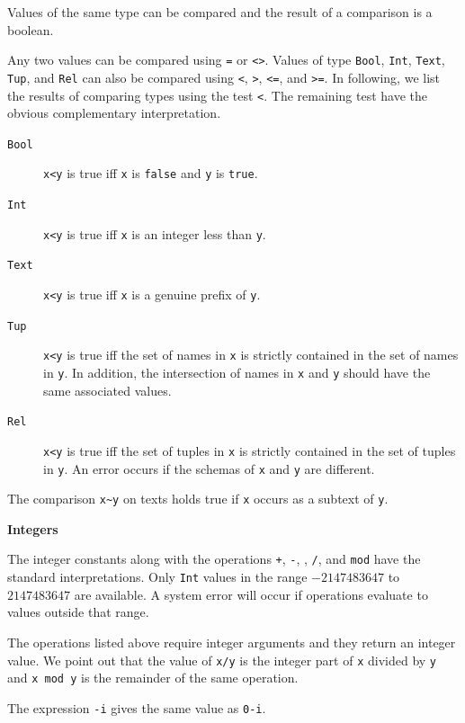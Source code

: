 \documentclass[a4,14pt,latin1]{article}
\begin{document}
Values of the same type can be compared and the result of a comparison is
a boolean.

Any two values can be compared using {\tt =} or {\tt <>}.
Values of type {\tt Bool}, {\tt Int}, {\tt Text}, {\tt Tup}, and
{\tt Rel} can also be compared using {\tt <}, {\tt >}, {\tt <=}, and {\tt >=}.
In following, we list the results of comparing types using the test {\tt <}.
The remaining test have the obvious complementary interpretation.
\begin{description}%
\item[{\tt Bool}]
{\tt x<y} is true iff {\tt x} is {\tt false} and {\tt y} is {\tt true}.
\item[{\tt Int}]
{\tt x<y} is true iff {\tt x} is an integer less than {\tt y}.
\item[{\tt Text}]
{\tt x<y} is true iff {\tt x} is a genuine prefix of {\tt y}.
\item[{\tt Tup}]
{\tt x<y} is true iff the set of names in {\tt x} is strictly contained in the
set of names in {\tt y}. In addition, the intersection of names in {\tt x}
and {\tt y} should have the same associated values.
\item[{\tt Rel}]
{\tt x<y} is true iff the set of tuples in {\tt x} is strictly contained
in the set of tuples in {\tt y}. An error occurs if the schemas of
{\tt x} and {\tt y} are different.
\end{description}
The comparison \verb"x~y" on texts holds true if \verb"x" occurs as
a subtext of \verb"y".

\vspace{2ex}
{\bf Integers}

The integer constants along with the operations
{\tt +}, {\tt -}, {\tt *}, {\tt /}, and {\tt mod}
have the standard interpretations. Only {\tt Int} values in the range
$-2147483647$ to $2147483647$ are available.
A system error will occur if operations evaluate to
values outside that range.

The operations listed above require integer arguments
and they return an integer value.
We point out that the value of {\tt x/y} is the integer part
of {\tt x} divided by {\tt y} and {\tt x mod y} is the remainder
of the same operation.

The expression {\tt -i} gives the same value as {\tt 0-i}.

\end{document}
